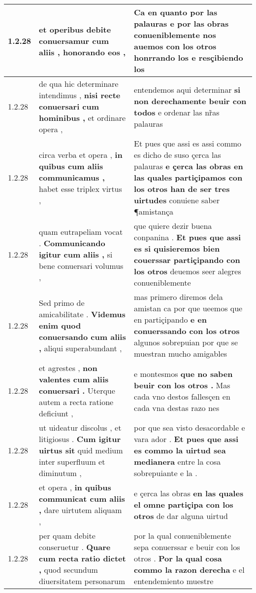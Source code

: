 \begin{tabular}{|p{1cm}|p{6.5cm}|p{6.5cm}|}
1.2.28 & et operibus debite \textbf{ conuersamur cum aliis , } honorando eos , & Ca en quanto por las palauras e por las obras \textbf{ conueniblemente nos auemos con los otros honrrando los } e resçibiendo los \\\hline
1.2.28 & de qua hic determinare intendimus , \textbf{ nisi recte conuersari cum hominibus , } et ordinare opera , & entendemos aqui determinar \textbf{ si non derechamente beuir con todos } e ordenar las nr̃as palauras \\\hline
1.2.28 & circa verba et opera , \textbf{ in quibus cum aliis communicamus , } habet esse triplex virtus , & Et pues que assi es assi commo es dicho de suso çerca las palauras \textbf{ e çerca las obras en las quales partiçipamos con los otros han de ser tres uirtudes } conuiene saber ¶amistança \\\hline
1.2.28 & quam eutrapeliam vocat . \textbf{ Communicando igitur cum aliis , } si bene conuersari volumus , & que quiere dezir buena conpanina . \textbf{ Et pues que assi es si quisieremos bien couerssar partiçipando con los otros } deuemos seer alegres conueniblemente \\\hline
1.2.28 & Sed primo de amicabilitate . \textbf{ Videmus enim quod conuersando cum aliis , } aliqui superabundant , & mas primero diremos dela amistan ca por que ueemos que en partiçipando \textbf{ e en conuerssando con los otros } algunos sobrepuian por que se muestran mucho amigables \\\hline
1.2.28 & et agrestes , \textbf{ non valentes cum aliis conuersari . } Uterque autem a recta ratione deficiunt , & e montesmos \textbf{ que no saben beuir con los otros . } Mas cada vno destos fallesçen en cada vna destas razo nes \\\hline
1.2.28 & ut uideatur discolus , et litigiosus . \textbf{ Cum igitur uirtus sit } quid medium inter superfluum et diminutum , & por que sea visto desacordable e vara ador . \textbf{ Et pues que assi es commo la uirtud sea medianera } entre la cosa sobrepuiante e la . \\\hline
1.2.28 & et opera , \textbf{ in quibus communicat cum aliis , } dare uirtutem aliquam , & e çerca las obras \textbf{ en las quales el omne partiçipa con los otros } de dar alguna uirtud \\\hline
1.2.28 & per quam debite conseruetur . \textbf{ Quare cum recta ratio dictet , } quod secundum diuersitatem personarum & por la qual conueniblemente sepa conuerssar e beuir con los otros . \textbf{ Por la qual cosa commo la razon derecha } e el entendemiento muestre \\\hline

\end{tabular}
